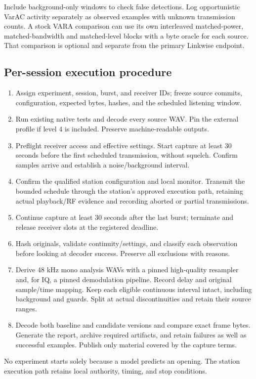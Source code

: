 \documentclass[11pt,a4paper]{article}
\begin{document}
Include background-only windows to check false detections. Log opportunistic VarAC activity separately as observed examples with unknown transmission counts. A stock VARA comparison can use its own interleaved matched-power, matched-bandwidth and matched-level blocks with a byte oracle for each source. That comparison is optional and separate from the primary Linkwise endpoint.


\subsection{Per-session execution procedure}
\label{md:6}

\begin{enumerate}
\item Assign experiment, session, burst, and receiver IDs; freeze source commits, configuration, expected bytes, hashes, and the scheduled listening window.
\item Run existing native tests and decode every source WAV. Pin the external profile if level 4 is included. Preserve machine-readable outputs.
\item Preflight receiver access and effective settings. Start capture at least 30 seconds before the first scheduled transmission, without squelch. Confirm samples arrive and establish a noise/background interval.
\item Confirm the qualified station configuration and local monitor. Transmit the bounded schedule through the station's approved execution path, retaining actual playback/RF evidence and recording aborted or partial transmissions.
\item Continue capture at least 30 seconds after the last burst; terminate and release receiver slots at the registered deadline.
\item Hash originals, validate continuity/settings, and classify each observation before looking at decoder success. Preserve all exclusions with reasons.
\item Derive 48 kHz mono analysis WAVs with a pinned high-quality resampler and, for IQ, a pinned demodulation pipeline. Record delay and original sample/time mapping. Keep each eligible continuous interval intact, including background and guards. Split at actual discontinuities and retain their source ranges.
\item Decode both baseline and candidate versions and compare exact frame bytes. Generate the report, archive required artifacts, and retain failures as well as successful examples. Publish only material covered by the capture terms.
\end{enumerate}
No experiment starts solely because a model predicts an opening. The station execution path retains local authority, timing, and stop conditions.
\end{document}
